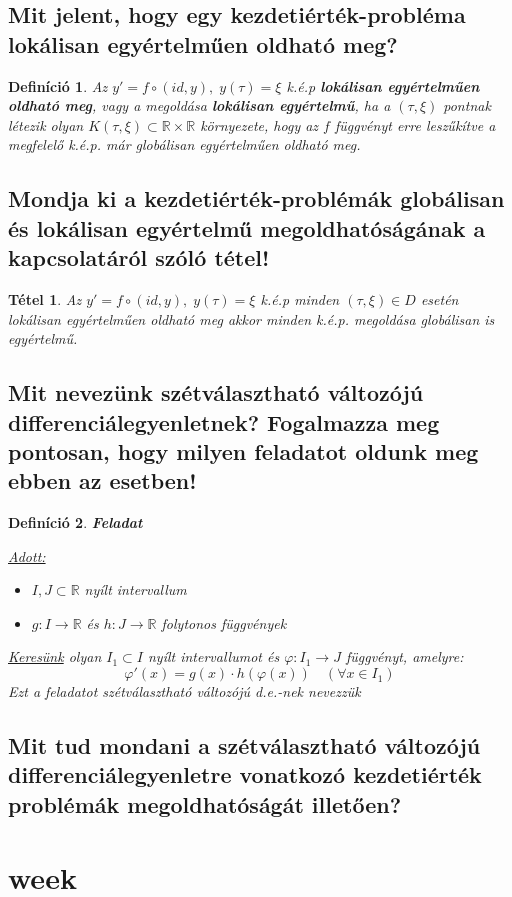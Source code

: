 \documentclass[12pt,a4paper]{article}
\newcommand{\R}{\mathbb{R}}
\newcommand{\f}{\varphi}
\newcommand{\bb}[1]{\left( #1 \right)}
\newtheorem{tet}{Tétel}[section]
\newtheorem{defi}{Definíció}[section]
\begin{document}
\subsection{Mit jelent, hogy egy kezdetiérték-probléma lokálisan egyértelműen oldható meg?}
\begin{defi}
Az $y' = f \circ \bb{id,y}, \; y(\tau) = \xi$ k.é.p \textbf{lokálisan egyértelműen oldható meg}, vagy a megoldása \textbf{lokálisan egyértelmű}, ha a $\bb{\tau,\xi}$ pontnak létezik olyan $K(\tau,\xi) \subset \R \times \R$ környezete, hogy az $f$ függvényt erre leszűkítve a megfelelő k.é.p. már globálisan egyértelműen oldható meg.
\end{defi}
\subsection{Mondja ki a kezdetiérték-problémák globálisan és lokálisan egyértelmű megoldhatóságának a kapcsolatáról szóló tétel!}
\begin{tet}
Az $y' = f \circ \bb{id,y}, \; y(\tau) = \xi$ k.é.p minden $\bb{\tau,\xi} \in D$ esetén lokálisan egyértelműen oldható meg akkor minden k.é.p. megoldása globálisan is egyértelmű.
\end{tet}
\subsection{Mit nevezünk szétválasztható változójú differenciálegyenletnek? Fogalmazza meg pontosan, hogy milyen feladatot oldunk meg ebben az esetben!}
\begin{defi}
\textbf{Feladat}

\underline{Adott:} \begin{itemize}
\item $I,J \subset \R$ nyílt intervallum
\item $g:I \to \R$ és $h:J\to \R$ folytonos függvények
\end{itemize}
\underline{Keresünk} olyan $I_1 \subset I$ nyílt intervallumot és $\f : I_1 \to J$ függvényt, amelyre:
\[
\f'(x) = g(x) \cdot h(\f(x)) \quad (\forall x \in I_1)
\]
Ezt a feladatot szétválasztható változójú d.e.-nek nevezzük
\end{defi}
\subsection{Mit tud mondani a szétválasztható változójú differenciálegyenletre vonatkozó kezdetiérték problémák megoldhatóságát illetően?}
\newpage
\section{week}
\end{document}
